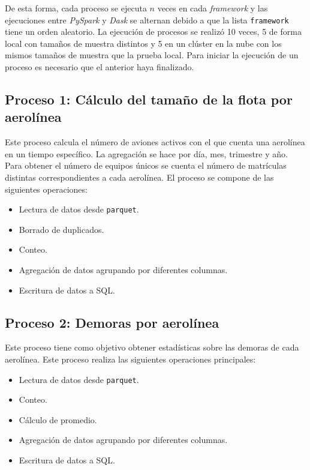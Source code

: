 De esta forma, cada proceso se ejecuta $n$ veces en cada \textit{framework} y las ejecuciones entre \textit{PySpark} y \textit{Dask} se alternan debido a que la lista \texttt{framework} tiene un orden aleatorio. La ejecución de procesos se realizó 10 veces, 5 de forma local con tamaños de muestra distintos y 5 en un clúster en la nube con los mismos tamaños de muestra que la prueba local. Para iniciar la ejecución de un proceso es necesario que el anterior haya finalizado.

\subsection{Proceso 1: Cálculo del tamaño de la flota por aerolínea}

Este proceso calcula el número de aviones activos con el que cuenta una aerolínea en un tiempo específico. La agregación se hace por día, mes, trimestre y año. Para obtener el número de equipos únicos se cuenta el número de matrículas distintas correspondientes a cada aerolínea. El proceso se compone de las siguientes operaciones:

\begin{itemize}
	\item Lectura de datos desde \texttt{parquet}.
	\item Borrado de duplicados.
	\item Conteo.
	\item Agregación de datos agrupando por diferentes columnas.
	\item Escritura de datos a SQL.
\end{itemize}

\subsection{Proceso 2: Demoras por aerolínea}

Este proceso tiene como objetivo obtener estadísticas sobre las demoras de cada aerolínea. Este proceso realiza las siguientes operaciones principales:

\begin{itemize}
	\item Lectura de datos desde \texttt{parquet}.
	\item Conteo.
	\item Cálculo de promedio.
	\item Agregación de datos agrupando por diferentes columnas.
	\item Escritura de datos a SQL.
\end{itemize}

